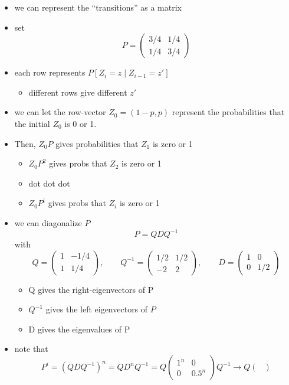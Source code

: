 \documentclass[11pt]{article}
\begin{document}
\begin{itemize}
\item we can represent the ``transitions'' as a matrix
\item set $$P = \begin{pmatrix} 3/4 & 1/4 \\ 1/4 & 3/4 \end{pmatrix}$$
\item each row represents $P[Z_i = z \mid Z_{i-1} = z']$
\begin{itemize}
\item different rows give different $z'$
\end{itemize}
\item we can let the row-vector $Z_0 = (1-p, p)$ represent the
        probabilities that the initial $Z_0$ is 0 or 1.
\item Then, $Z_0 P$ gives probabilities that $Z_1$ is zero or 1
\begin{itemize}
\item $Z_0 P^2$ gives probs that $Z_2$ is zero or 1
\item dot dot dot
\item $Z_0 P^i$ gives probs that $Z_i$ is zero or 1
\end{itemize}
\item we can diagonalize $P$
        \[P = Q D Q^{-1}\]
        with
        \[Q = \begin{pmatrix} 1 & -1/4 \\ 1 &
        1/4 \end{pmatrix},\qquad 
        Q^{-1} = \begin{pmatrix} 1/2 & 1/2 \\ -2 & 2 \end{pmatrix},
        \qquad 
        D = \begin{pmatrix} 1 & 0 \\ 0 & 1/2 \end{pmatrix}\]
\begin{itemize}
\item Q gives the right-eigenvectors of P
\item $Q^{-1}$ gives the left eigenvectors of $P$
\item D gives the eigenvalues of P
\end{itemize}
\item note that 
        \[P^{i} = (Q D Q^{-1})^n = Q D^n Q^{-1} = Q \begin{pmatrix}
        1^n & 0 \\ 0 & 0.5^n \end{pmatrix} Q^{-1} \to Q \begin{pmatrix}

\end{pmatrix}\]
\end{itemize}
\end{document}
